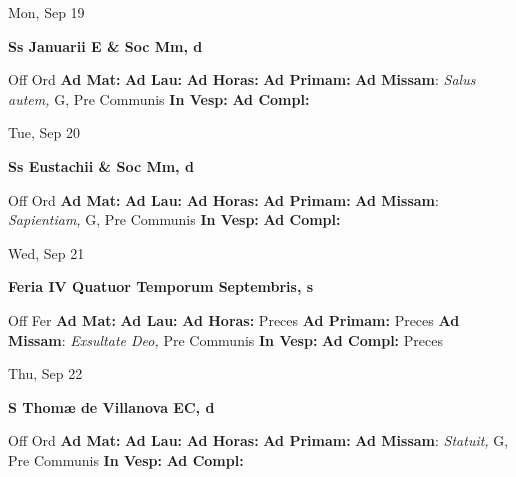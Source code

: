 \documentclass[10pt]{article}
\begin{document}
\begin{minipage}{3.5in}
\vspace{2em}\begin{center}
Mon, Sep 19
\end{center}\textbf{ \large Ss Januarii E \& Soc Mm, \textnormal{\normalsize d}}
\begin{justify}
Off Ord
\textbf{Ad Mat: }
\textbf{Ad Lau: }
\textbf{Ad Horas: }
\textbf{Ad Primam: }
\textbf{Ad Missam}: \textit{Salus autem,} G, Pre Communis
\textbf{In Vesp: }
\textbf{Ad Compl: }\end{justify}
\end{minipage}



\begin{minipage}{3.5in}
\vspace{2em}\begin{center}
Tue, Sep 20
\end{center}\textbf{ \large Ss Eustachii \& Soc Mm, \textnormal{\normalsize d}}
\begin{justify}
Off Ord
\textbf{Ad Mat: }
\textbf{Ad Lau: }
\textbf{Ad Horas: }
\textbf{Ad Primam: }
\textbf{Ad Missam}: \textit{Sapientiam,} G, Pre Communis
\textbf{In Vesp: }
\textbf{Ad Compl: }\end{justify}
\end{minipage}



\begin{minipage}{3.5in}
\vspace{2em}\begin{center}
Wed, Sep 21
\end{center}\textbf{ \large Feria IV Quatuor Temporum Septembris, \textnormal{\normalsize s}}
\begin{justify}
Off Fer
\textbf{Ad Mat: }
\textbf{Ad Lau: }
\textbf{Ad Horas: }Preces
\textbf{Ad Primam: }Preces
\textbf{Ad Missam}: \textit{Exsultate Deo,} Pre Communis
\textbf{In Vesp: }
\textbf{Ad Compl: }Preces\end{justify}
\end{minipage}



\begin{minipage}{3.5in}
\vspace{2em}\begin{center}
Thu, Sep 22
\end{center}\textbf{ \large S Thomæ de Villanova EC, \textnormal{\normalsize d}}
\begin{justify}
Off Ord
\textbf{Ad Mat: }
\textbf{Ad Lau: }
\textbf{Ad Horas: }
\textbf{Ad Primam: }
\textbf{Ad Missam}: \textit{Statuit,} G, Pre Communis
\textbf{In Vesp: }
\textbf{Ad Compl: }\end{justify}
\end{minipage}
\end{document}
